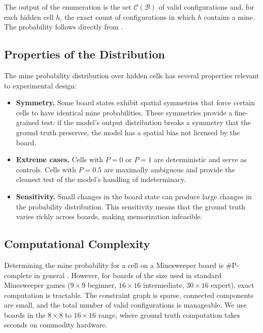 \documentclass[12pt,a4paper]{article}
\begin{document}
The output of the enumeration is the set $\mathcal{C}(\mathcal{B})$ of valid configurations and, for each hidden cell $h$, the exact count of configurations in which $h$ contains a mine. The probability follows directly from .

\subsection{Properties of the Distribution}
\label{sec:distribution_properties}

The mine probability distribution over hidden cells has several properties relevant to experimental design:

\begin{itemize}[nosep]
    \item \textbf{Symmetry.} Some board states exhibit spatial symmetries that force certain cells to have identical mine probabilities. These symmetries provide a fine-grained test: if the model's output distribution breaks a symmetry that the ground truth preserves, the model has a spatial bias not licensed by the board.
    \item \textbf{Extreme cases.} Cells with $P = 0$ or $P = 1$ are deterministic and serve as controls. Cells with $P = 0.5$ are maximally ambiguous and provide the cleanest test of the model's handling of indeterminacy.
    \item \textbf{Sensitivity.} Small changes in the board state can produce large changes in the probability distribution. This sensitivity means that the ground truth varies richly across boards, making memorization infeasible.
\end{itemize}

\subsection{Computational Complexity}
\label{sec:complexity}

Determining the mine probability for a cell on a Minesweeper board is \#P-complete in general \citep{kaye2000}. However, for boards of the size used in standard Minesweeper games ($9 \times 9$ beginner, $16 \times 16$ intermediate, $30 \times 16$ expert), exact computation is tractable. The constraint graph is sparse, connected components are small, and the total number of valid configurations is manageable. We use boards in the $8 \times 8$ to $16 \times 16$ range, where ground truth computation takes seconds on commodity hardware.
\end{document}
